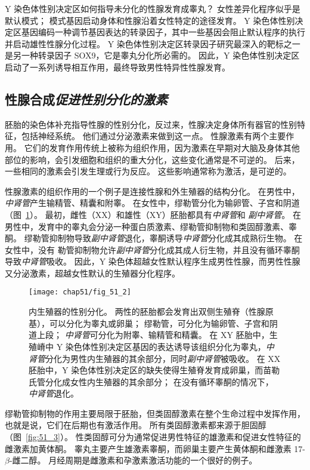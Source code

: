 Y 染色体性别决定区如何指导未分化的性腺发育成睾丸？
女性差异化程序似乎是默认模式；
模式基因启动身体和性腺沿着女性特定的途径发育。
Y 染色体性别决定区基因编码一种调节基因表达的转录因子，其中一些基因会阻止默认程序的执行并启动雄性性腺分化过程。
Y 染色体性别决定区转录因子研究最深入的靶标之一是另一种转录因子 SOX9，它是睾丸分化所必需的。
因此，Y 染色体性别决定区启动了一系列诱导相互作用，最终导致男性特异性性腺发育。



\subsection{性腺合成\textit{促进性别分化的激素}}

胚胎的染色体补充指导性腺的性别分化，反过来，性腺决定身体所有器官的性别特征，包括神经系统。
他们通过分泌激素来做到这一点。
性腺激素有两个主要作用。
它们的发育作用传统上被称为组织作用，因为激素在早期对大脑及身体其他部位的影响，会引发细胞和组织的重大分化，这些变化通常是不可逆的。
后来，一些相同的激素会引发生理或行为反应。
这些影响通常称为激活，是可逆的。


性腺激素的组织作用的一个例子是连接性腺和外生殖器的结构分化。
在男性中，\textit{中肾管}产生输精管、精囊和附睾。
在女性中，缪勒管分化为输卵管、子宫和阴道（图~\ref{fig:51_2}）。
最初，雌性（XX）和雄性（XY）胚胎都具有\textit{中肾管}和 \textit{副中肾管}。
在男性中，发育中的睾丸会分泌一种蛋白质激素、缪勒管抑制物和类固醇激素、睾酮。
缪勒管抑制物导致\textit{副中肾管}退化，睾酮诱导\textit{中肾管}分化成其成熟衍生物。
在女性中，没有 勒管抑制物允许\textit{副中肾管}分化成其成人衍生物，并且没有循环睾酮导致\textit{中肾管}吸收。
因此，Y 染色体超越女性默认程序生成男性性腺，而男性性腺又分泌激素，超越女性默认的生殖器分化程序。


\begin{figure}[htbp]
	\centering
	\texttt{[image: chap51/fig\_51\_2]}
	\caption{内生殖器的性别分化。
		两性的胚胎都会发育出双侧生殖脊（性腺原基），可以分化为睾丸或卵巢； 缪勒管，可分化为输卵管、子宫和阴道上段；
		\textit{中肾管}可分化为附睾、输精管和精囊。
		在 XY 胚胎中，生殖嵴中 Y 染色体性别决定区基因的表达诱导该组织分化为睾丸，\textit{中肾管}分化为男性内生殖器的其余部分，同时\textit{副中肾管}被吸收。
		在 XX 胚胎中，Y 染色体性别决定区的缺失使得生殖脊发育成卵巢，而苗勒氏管分化成女性内生殖器的其余部分；
		在没有循环睾酮的情况下，\textit{中肾管}退化\cite{wilhelm2007sex}。}
	\label{fig:51_2}
\end{figure}


缪勒管抑制物的作用主要局限于胚胎，但类固醇激素在整个生命过程中发挥作用，也就是说，它们在后期也有激活作用。 
所有类固醇激素都来源于胆固醇（图~\ref{fig:51_3}）。
性类固醇可分为通常促进男性特征的雄激素和促进女性特征的雌激素加黄体酮。
睾丸主要产生雄激素睾酮，而卵巢主要产生黄体酮和雌激素 17-$ \beta $-雌二醇。
月经周期是雌激素和孕激素激活功能的一个很好的例子。


